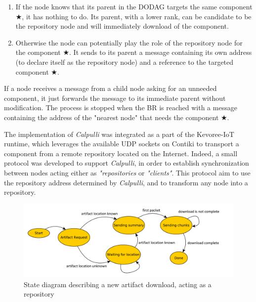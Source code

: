 \begin{enumerate}
	\item If the node knows that its parent in the DODAG targets the same component $\bigstar$, it has nothing to do. Its parent, with a lower rank, can be candidate to be the repository node and will immediately  download of the component.
	\item Otherwise the node can potentially play the role of the repository node for the component $\bigstar$. It sends to its parent a message containing its own address (to declare itself as the repository node) and a reference to the targeted component $\bigstar$.
\end{enumerate}

If a node receives a message from a child node asking for an unneeded component, it just forwards the message to its immediate parent without modification. The process is stopped when the BR is reached with a message containing the address of the "nearest node" that needs the component $\bigstar$.


The implementation of \textit{Calpulli} was integrated as a part of the Kevoree-IoT runtime, which leverages the available UDP sockets on Contiki to transport a component from a remote repository located on the Internet.
Indeed, a small protocol was developed to support \textit{Calpulli}, in order to establish synchronization between nodes acting either as \textit{"repositories} or \textit{"clients"}.
This protocol aim to use the repository address determined by \textit{Calpulli}, and to transform any node into a repository.

\begin{figure}[]
	\centering
	\includegraphics[width=0.98\columnwidth]{chapters/calpulli.images/calpulliProtocol.pdf}
	\caption{State diagram describing a new artifact download, acting as a repository} \label{fig:calpulliProtocol}
\end{figure}

